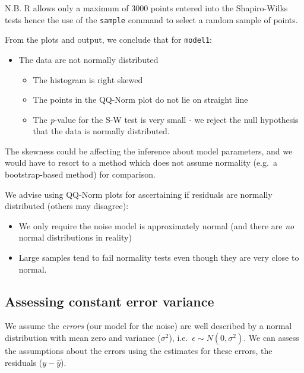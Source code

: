 \documentclass[
  oneside]{krantz}
\providecommand{\tightlist}{%
  \setlength{\itemsep}{0pt}\setlength{\parskip}{0pt}}
\begin{document}
N.B. R allows only a maximum of 3000 points entered into the Shapiro-Wilks tests hence the use of the \texttt{sample} command to select a random sample of points.

From the plots and output, we conclude that for \texttt{model1}:

\begin{itemize}
\item
  The data are not normally distributed

  \begin{itemize}
  \tightlist
  \item
    The histogram is right skewed
  \item
    The points in the QQ-Norm plot do not lie on straight line
  \item
    The \emph{p}-value for the S-W test is very small - we reject the null hypothesis that the data is normally distributed.
  \end{itemize}
\end{itemize}

The skewness could be affecting the inference about model parameters, and we would have to resort to a method which does not assume normality (e.g.~a bootstrap-based method) for comparison.

We advise using QQ-Norm plots for ascertaining if residuals are normally distributed (others may disagree):

\begin{itemize}
\tightlist
\item
  We only require the noise model is approximately normal (and there are \emph{no} normal distributions in reality)
\item
  Large samples tend to fail normality tests even though they are very close to normal.
\end{itemize}

\hypertarget{assessing-constant-error-variance}{%
\subsection{Assessing constant error variance}\label{assessing-constant-error-variance}}

We assume the \emph{errors} (our model for the noise) are well described by a normal distribution with mean zero and variance (\(\sigma^2\)), i.e.~\(\epsilon \sim N(0,\sigma^2)\). We can assess the assumptions about the errors using the estimates for these errors, the residuals (\(y-\hat{y}\)).
\end{document}

